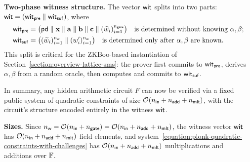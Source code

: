 \medskip
\noindent\textbf{Two-phase witness structure.}
The vector $\mathsf{wit}$ splits into two parts:
$\mathsf{wit} = (\mathsf{wit}_\mathsf{pre} \;\|\; \mathsf{wit}_\mathsf{suf})$, where
\begin{align*}
\mathsf{wit}_\mathsf{pre} &= \bigl(\mathsf{pd} \;\|\; \mathbf{x} \;\|\; \mathbf{a} \;\|\; \mathbf{b} \;\|\; \mathbf{c} \;\|\;
(\widehat{w}_i)_{i = 1}^{n_\mathsf{gate}}\bigr)
\quad\text{is determined without knowing } \alpha, \beta;
\\
\mathsf{wit}_\mathsf{suf} &= \bigl((\widetilde{w}_i)_{i = 1}^{n_\mathsf{w}} \;\|\; (w'_i)_{i = 1}^{n_\mathsf{w}}\bigr)
\quad\text{is determined only after } \alpha, \beta \text{ are known.}
\end{align*}
This split is critical for the ZKBoo-based instantiation of Section~\ref{section:overview-lattice-sms}:
the prover first commits to $\mathsf{wit}_\mathsf{pre}$,
derives $\alpha, \beta$ from a random oracle,
then computes and commits to $\mathsf{wit}_\mathsf{suf}$.

In summary, any hidden arithmetic circuit $F$ can now be verified
via a fixed public system of quadratic constraints of size
$\mathcal{O}(n_\mathsf{in} + n_\mathsf{add} + n_\mathsf{mlt})$,
with the circuit's structure encoded entirely in the witness $\mathsf{wit}$.


\medskip
\noindent\textbf{Sizes.}
Since $n_\mathsf{w} = \mathcal{O}(n_\mathsf{in} + n_\mathsf{gate}) = \mathcal{O}(n_\mathsf{in} + n_\mathsf{add} + n_\mathsf{mlt})$,
the witness vector $\mathsf{wit}$ has $\mathcal{O}(n_\mathsf{in} + n_\mathsf{add} + n_\mathsf{mlt})$ field elements,
and system~\eqref{equation:plonk-quadratic-constraints-with-challenges}
has $\mathcal{O}(n_\mathsf{in} + n_\mathsf{add} + n_\mathsf{mlt})$ multiplications and additions over $\mathbb{F}$.
